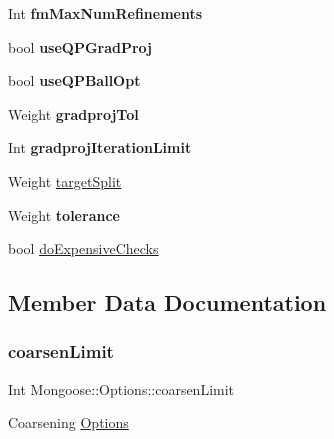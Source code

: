 \begin{DoxyCompactItemize}
\hypertarget{struct_mongoose_1_1_options_a6380f2f53f255559a3211bad1bd67453}{}\label{struct_mongoose_1_1_options_a6380f2f53f255559a3211bad1bd67453} 
Int {\bfseries fm\+Max\+Num\+Refinements}
\item 
\hypertarget{struct_mongoose_1_1_options_a7b9626a337262477328da38602500461}{}\label{struct_mongoose_1_1_options_a7b9626a337262477328da38602500461} 
bool {\bfseries use\+Q\+P\+Grad\+Proj}
\item 
\hypertarget{struct_mongoose_1_1_options_a80ad7f47e8e80398cd89d6d0ec7fa179}{}\label{struct_mongoose_1_1_options_a80ad7f47e8e80398cd89d6d0ec7fa179} 
bool {\bfseries use\+Q\+P\+Ball\+Opt}
\item 
\hypertarget{struct_mongoose_1_1_options_a09f4d6649fbbf2e90cdfd674bb2b8082}{}\label{struct_mongoose_1_1_options_a09f4d6649fbbf2e90cdfd674bb2b8082} 
Weight {\bfseries gradproj\+Tol}
\item 
\hypertarget{struct_mongoose_1_1_options_af9a52917b5aea989b27833e81c8c0cf7}{}\label{struct_mongoose_1_1_options_af9a52917b5aea989b27833e81c8c0cf7} 
Int {\bfseries gradproj\+Iteration\+Limit}
\item 
Weight \hyperlink{struct_mongoose_1_1_options_a26ae6bb0a93bd36a365c472877b6d5e9}{target\+Split}
\item 
\hypertarget{struct_mongoose_1_1_options_a4d2c698371dc491e4e52b2d690e9a06e}{}\label{struct_mongoose_1_1_options_a4d2c698371dc491e4e52b2d690e9a06e} 
Weight {\bfseries tolerance}
\item 
bool \hyperlink{struct_mongoose_1_1_options_a75794c7e8f81ebc9cf7f7eef07f56eb4}{do\+Expensive\+Checks}
\end{DoxyCompactItemize}


\subsection{Member Data Documentation}
\hypertarget{struct_mongoose_1_1_options_a240d271ff083f6d841cf8f3ea626dd5a}{}\label{struct_mongoose_1_1_options_a240d271ff083f6d841cf8f3ea626dd5a} 
\subsubsection{\texorpdfstring{coarsen\+Limit}{coarsenLimit}}
{\footnotesize\ttfamily Int Mongoose\+::\+Options\+::coarsen\+Limit}

Coarsening \hyperlink{struct_mongoose_1_1_options}{Options} \hypertarget{struct_mongoose_1_1_options_a75794c7e8f81ebc9cf7f7eef07f56eb4}{}\label{struct_mongoose_1_1_options_a75794c7e8f81ebc9cf7f7eef07f56eb4} 
